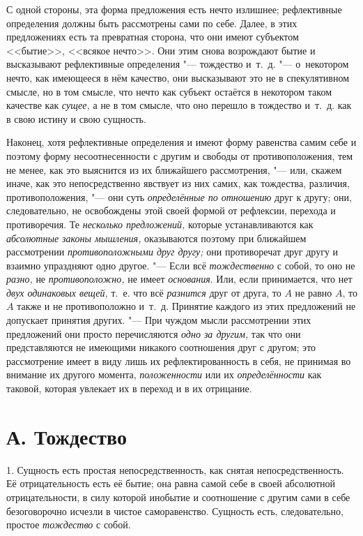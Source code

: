 С одной стороны, эта форма предложения есть нечто излишнее; рефлективные
определения должны быть рассмотрены сами по себе. Далее, в этих
предложениях есть та превратная сторона, что они имеют субъектом <<бытие>>,
<<всякое нечто>>. Они этим снова возрождают бытие и высказывают рефлективные
определения "--- тождество и~т.~д. "--- о~некотором нечто, как имеющееся в нём
качество, они высказывают это не в спекулятивном смысле, но в том смысле,
что нечто как субъект остаётся в некотором таком качестве как
{\em сущее,} а не в том смысле, что оно перешло в
тождество и~т.~д. как в свою истину и свою сущность.

Наконец, хотя рефлективные определения и имеют форму равенства самим себе и
поэтому форму несоотнесенности с другим и свободы от противоположения, тем
не менее, как это выяснится из их ближайшего рассмотрения, "--- или, скажем
иначе, как это непосредственно явствует из них самих, как тождества,
различия, противоположения, "--- они суть
{\em определённые по отношению} друг к другу; они,
следовательно, не освобождены этой своей формой от рефлексии, перехода и
противоречия. Те {\em несколько предложений,} которые
устанавливаются как {\em абсолютные законы мышления,}
оказываются поэтому при ближайшем рассмотрении
{\em противоположными друг другу;} они противоречат
друг другу и взаимно упраздняют одно другое. "--- Если всё
{\em тождественно} с собой, то оно не {\em разно,} не
{\em противоположно,} не имеет {\em основания}. Или, если принимается, что нет
{\em двух одинаковых вещей,} т.~е. что всё
{\em разнится} друг от друга, то $A$ не равно
$A$, то $A$ также и не противоположно и~т.~д. Принятие
каждого из этих предложений не допускает принятия других. "--- При чуждом
мысли рассмотрении этих предложений они просто перечисляются
{\em одно за другим,} так что они представляются не
имеющими никакого соотношения друг с другом; это рассмотрение имеет в виду
лишь их рефлектированность в себя, не принимая во внимание их другого
момента, {\em положенности} или их
{\em определённости} как таковой, которая увлекает их в
переход и в их отрицание.

\section[А. Тождество]{А. Тождество}
1. Сущность есть простая непосредственность, как
снятая непосредственность. Её отрицательность есть её бытие; она равна
самой себе в своей абсолютной отрицательности, в силу которой инобытие и
соотношение с другим сами в себе безоговорочно исчезли в чистое
саморавенство. Сущность есть, следовательно, простое
{\em тождество} с собой.


